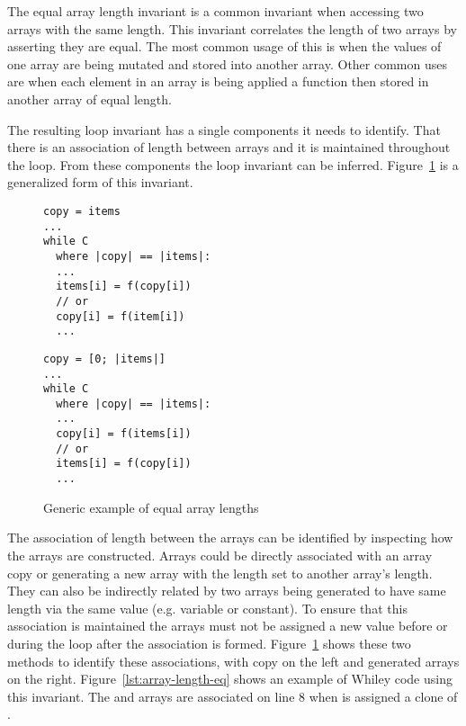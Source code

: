 The equal array length invariant is a common invariant when accessing two
arrays with the same length.
This invariant correlates the length of two arrays by asserting they are equal.
The most common usage of this is when the values of one array are being mutated
and stored into another array.
Other common uses are when each element in an array is being applied
a function then stored in another array of equal length.

The resulting loop invariant has a single components it needs to identify.
That there is an association of length between arrays and it is maintained
throughout the loop.
From these components the loop invariant can be inferred.
Figure~\ref{lst:equal-array-length-gen} is a generalized form
of this invariant.


\begin{figure}[ht]
\noindent
\begin{minipage}{.45\textwidth}
\begin{lstlisting}
copy = items
...
while C
  where |copy| == |items|:
  ...
  items[i] = f(copy[i])
  // or
  copy[i] = f(item[i])
  ...
\end{lstlisting}
\end{minipage}\hfill
\begin{minipage}{.45\textwidth}
\begin{lstlisting}
copy = [0; |items|]
...
while C
  where |copy| == |items|:
  ...
  copy[i] = f(items[i])
  // or
  items[i] = f(copy[i])
  ...
\end{lstlisting}
\end{minipage}
\caption{Generic example of equal array lengths}
\label{lst:equal-array-length-gen}
\end{figure}

The association of length between the arrays can be identified by inspecting 
how the arrays are constructed.
Arrays could be directly associated with an array copy or generating
a new array with the length set to another array's length.
They can also be indirectly related by two arrays being generated
to have same length via the same value (e.g. variable or constant).
To ensure that this association is maintained the arrays must not 
be assigned a new value before or during the loop after the association
is formed.
Figure~\ref{lst:equal-array-length-gen} shows these two methods to
identify these associations, with copy on the left and generated 
arrays on the right.
Figure~\ref{lst:array-length-eq} shows an example of 
Whiley code using this invariant.
The  and  arrays are associated on line
8 when  is assigned a clone of . 


